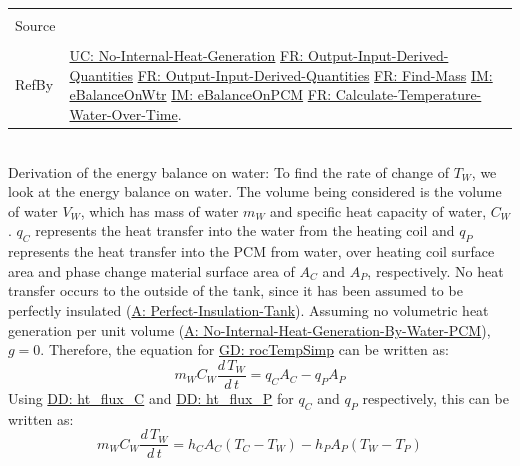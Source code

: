 \documentclass[12pt]{article}
\begin{document}
\begin{minipage}{\textwidth}
\begin{tabular}{p{} p{}}
                                                                                                   \\ \midrule \\
                                                                                                   Source & \cite{koothoor2013}
                                                                                                            \\ \midrule \\
                                                                                                            RefBy & \hyperref[unlikeChgNIHG]{UC: No-Internal-Heat-Generation} \hyperref[outputInputDerivQuants]{FR: Output-Input-Derived-Quantities} \hyperref[outputInputDerivQuants]{FR: Output-Input-Derived-Quantities} \hyperref[findMass]{FR: Find-Mass} \hyperref[IM:eBalanceOnWtr]{IM: eBalanceOnWtr} \hyperref[IM:eBalanceOnPCM]{IM: eBalanceOnPCM} \hyperref[calcTempWtrOverTime]{FR: Calculate-Temperature-Water-Over-Time}.
\\ \bottomrule \end{tabular}
\end{minipage}\\
Derivation of the energy balance on water:
To find the rate of change of ${T_{W}}$, we look at the energy balance on water. The volume being considered is the volume of water ${V_{W}}$, which has mass of water ${m_{W}}$ and specific heat capacity of water, ${C_{W}}$. ${q_{C}}$ represents the heat transfer into the water from the heating coil and ${q_{P}}$ represents the heat transfer into the PCM from water, over heating coil surface area and phase change material surface area of ${A_{C}}$ and ${A_{P}}$, respectively. No heat transfer occurs to the outside of the tank, since it has been assumed to be perfectly insulated (\hyperref[A:Perfect-Insulation-Tank]{A: Perfect-Insulation-Tank}). Assuming no volumetric heat generation per unit volume (\hyperref[A:No-Internal-Heat-Generation-By-Water-PCM]{A: No-Internal-Heat-Generation-By-Water-PCM}), $g=0$. Therefore, the equation for \hyperref[GD:rocTempSimp]{GD: rocTempSimp} can be written as:
\begin{dmath}
{m_{W}} {C_{W}} \frac{d\,{T_{W}}}{d\,t}={q_{C}} {A_{C}}-{q_{P}} {A_{P}}
\end{dmath}
Using \hyperref[DD:ht.flux.C]{DD: ht\_flux\_C} and \hyperref[DD:ht.flux.P]{DD: ht\_flux\_P} for ${q_{C}}$ and ${q_{P}}$ respectively, this can be written as:
\begin{dmath}
{m_{W}} {C_{W}} \frac{d\,{T_{W}}}{d\,t}={h_{C}} {A_{C}} \left({T_{C}}-{T_{W}}\right)-{h_{P}} {A_{P}} \left({T_{W}}-{T_{P}}\right)
\end{dmath}
\end{document}
